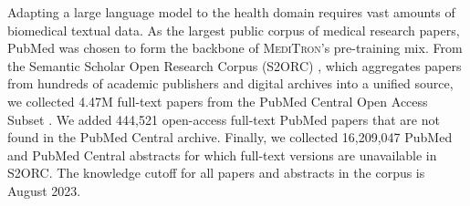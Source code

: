 \documentclass{article}
\newcommand{\mtron}{\textsc{MediTron}\xspace}
\begin{document}
Adapting a large language model to the health domain requires vast amounts of biomedical textual data. 
As the largest public corpus of medical research papers, PubMed was chosen to form the backbone of \mtron's pre-training mix. From the Semantic Scholar Open Research Corpus (S2ORC) \citep{lo-wang-2020-s2orc}, which aggregates papers from hundreds of academic publishers and digital archives into a unified source, we collected 4.47M full-text papers from the PubMed Central Open Access Subset \citep{pmc_open_access}. 
We added 444,521 open-access full-text PubMed papers that are not found in the PubMed Central archive. Finally, we collected 16,209,047 PubMed and PubMed Central abstracts for which full-text versions are unavailable in S2ORC. The knowledge cutoff for all papers and abstracts in the corpus is August 2023. 
\end{document}
